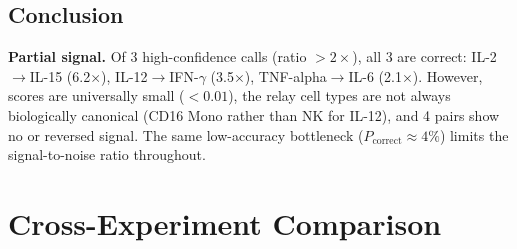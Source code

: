 \documentclass[11pt,a4paper]{article}
\begin{document}
\subsection{Conclusion}

\textbf{Partial signal.} Of 3 high-confidence calls (ratio $>2\times$), all
3 are correct: IL-2$\to$IL-15 (6.2$\times$), IL-12$\to$IFN-$\gamma$ (3.5$\times$),
TNF-alpha$\to$IL-6 (2.1$\times$). However, scores are universally small
($< 0.01$), the relay cell types are not always biologically canonical (CD16
Mono rather than NK for IL-12), and 4 pairs show no or reversed signal.
The same low-accuracy bottleneck ($P_{\text{correct}} \approx 4\%$) limits
the signal-to-noise ratio throughout.

\section{Cross-Experiment Comparison}
\end{document}
